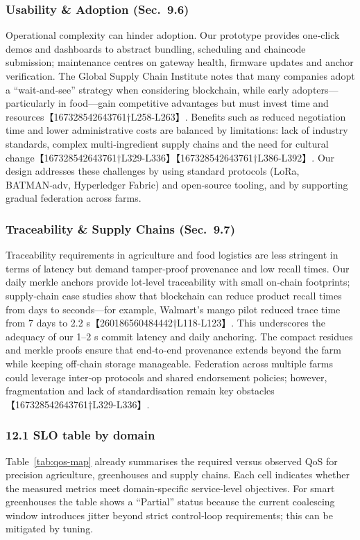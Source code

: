 \documentclass[12pt,onecolumn]{IEEEtran} %
\begin{document}
\subsubsection{Usability \& Adoption (Sec.~9.6)}
Operational complexity can hinder adoption.  Our prototype provides one‑click demos and dashboards to abstract bundling, scheduling and chaincode submission; maintenance centres on gateway health, firmware updates and anchor verification.  The Global Supply Chain Institute notes that many companies adopt a ``wait‑and‑see'' strategy when considering blockchain, while early adopters—particularly in food—gain competitive advantages but must invest time and resources【167328542643761†L258-L263】.  Benefits such as reduced negotiation time and lower administrative costs are balanced by limitations: lack of industry standards, complex multi‑ingredient supply chains and the need for cultural change【167328542643761†L329-L336】【167328542643761†L386-L392】.  Our design addresses these challenges by using standard protocols (LoRa, BATMAN‑adv, Hyperledger Fabric) and open‑source tooling, and by supporting gradual federation across farms.

\subsubsection{Traceability \& Supply Chains (Sec.~9.7)}
Traceability requirements in agriculture and food logistics are less stringent in terms of latency but demand tamper‑proof provenance and low recall times.  Our daily merkle anchors provide lot‑level traceability with small on‑chain footprints; supply‑chain case studies show that blockchain can reduce product recall times from days to seconds—for example, Walmart’s mango pilot reduced trace time from 7 days to 2.2 s【260186560484442†L118-L123】.  This underscores the adequacy of our 1–2 s commit latency and daily anchoring.  The compact residues and merkle proofs ensure that end‑to‑end provenance extends beyond the farm while keeping off‑chain storage manageable.  Federation across multiple farms could leverage inter‑op protocols and shared endorsement policies; however, fragmentation and lack of standardisation remain key obstacles【167328542643761†L329-L336】.

\subsubsection*{12.1 SLO table by domain}
Table~\ref{tab:qos-map} already summarises the required versus observed QoS for precision agriculture, greenhouses and supply chains.  Each cell indicates whether the measured metrics meet domain‑specific service‑level objectives.  For smart greenhouses the table shows a ``Partial'' status because the current coalescing window introduces jitter beyond strict control‑loop requirements; this can be mitigated by tuning.
\end{document}
